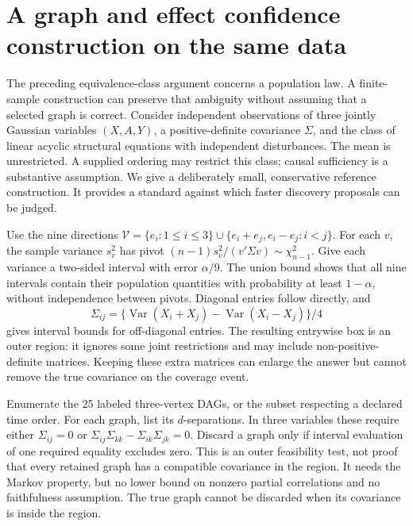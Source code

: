 \section{A graph and effect confidence construction on the same data}
\label{s4:graph-confidence}
The preceding equivalence-class argument concerns a population law. A
finite-sample construction can preserve that ambiguity without assuming
that a selected graph is correct. Consider independent observations of
three jointly Gaussian variables $(X,A,Y)$, a positive-definite covariance
$\Sigma$, and the class of linear acyclic structural equations with
independent disturbances. The mean is unrestricted. A supplied ordering
may restrict this class; causal sufficiency is a substantive assumption.
We give a deliberately small, conservative reference construction. It
provides a standard against which faster discovery proposals can be judged.

Use the nine directions
$\mathcal V=\{e_i:1\le i\le3\}\cup
\{e_i+e_j,e_i-e_j:i<j\}$. For each $v$, the sample variance $s_v^2$
has pivot $(n-1)s_v^2/(v'\Sigma v)\sim\chi^2_{n-1}$. Give each
variance a two-sided interval with error $\alpha/9$. The union bound
shows that all nine intervals contain their population quantities with
probability at least $1-\alpha$, without independence between pivots.
Diagonal entries follow directly, and
\[
 \Sigma_{ij}=\{\operatorname{Var}(X_i+X_j)
                     -\operatorname{Var}(X_i-X_j)\}/4
\]
gives interval bounds for off-diagonal entries. The resulting entrywise
box is an outer region: it ignores some joint restrictions and may include
non-positive-definite matrices. Keeping these extra matrices can enlarge
the answer but cannot remove the true covariance on the coverage event.

Enumerate the 25 labeled three-vertex DAGs, or the subset respecting a
declared time order. For each graph, list its $d$-separations. In three
variables these require either $\Sigma_{ij}=0$ or
$\Sigma_{ij}\Sigma_{kk}-\Sigma_{ik}\Sigma_{jk}=0$. Discard a graph
only if interval evaluation of one required equality excludes zero.
This is an outer feasibility test, not proof that every retained graph
has a compatible covariance in the region. It needs the Markov property,
but no lower bound on nonzero partial correlations and no faithfulness
assumption. The true graph cannot be discarded when its covariance is
inside the region.

